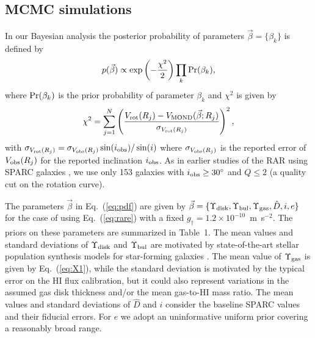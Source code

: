 \documentclass[twocolumn,tighten]{aastex63}
\begin{document}
\subsection{MCMC simulations}  \label{sec:mcmc}

In our Bayesian analysis the posterior probability of parameters $\vec{\beta}=\{\beta_k\}$ is defined by
   \begin{equation}
     p(\vec{\beta}) \propto \exp\left( -\frac{\chi^2}{2} \right) \prod_k {\rm Pr}(\beta_k),
     \label{eq:pdf}
   \end{equation}
where ${\rm Pr}(\beta_k)$ is the prior probability of parameter $\beta_k$ and $\chi^2$ is given by
   \begin{equation}
     \chi^2 = \sum_{j=1}^{N} \left( \frac{V_{\rm rot}(R_j) - V_{\rm MOND}(\vec{\beta};R_j)}{\sigma_{V_{\rm rot}(R_j)}} \right)^2,
     \label{eq:chi2}
   \end{equation}
with $\sigma_{V_{\rm rot}(R_j)}= \sigma_{V_{\rm obs}(R_j)} \sin(i_{\rm obs})/\sin(i)$ where $\sigma_{V_{\rm obs}(R_j)}$ is the reported error of $V_{\rm obs}(R_j)$ for the reported inclination $i_{\rm obs}$. As in earlier studies of the RAR using SPARC galaxies \citep{MLS, Lel17}, we use only 153 galaxies with $i_{\rm obs} \ge 30^\circ$ and $Q \le 2$ (a quality cut on the rotation curve).

The parameters $\vec{\beta}$ in Eq.~(\ref{eq:pdf}) are given by $\vec{\beta}=\{\Upsilon_{\rm disk}, \Upsilon_{\rm bul}, \Upsilon_{\rm gas}, \hat{D}, i, e\}$ for the case of using Eq.~(\ref{eq:rare}) with a fixed $g_\dagger=1.2\times 10^{-10}$~m~s$^{-2}$. The priors on these parameters are summarized in Table~1. The mean values and standard deviations of $\Upsilon_{\rm disk}$ and $\Upsilon_{\rm bul}$ are motivated by state-of-the-art stellar population synthesis models for star-forming galaxies \citep{Schom19}. The mean value of $\Upsilon_{\rm gas}$ is given by Eq.~(\ref{eq:X1}), while the standard deviation is motivated by the typical error on the HI flux calibration, but it could also represent variations in the assumed gas disk thickness and/or the mean gas-to-HI mass ratio. The mean values and standard deviations of $\hat{D}$ and $i$ consider the baseline SPARC values and their fiducial errors. For $e$ we adopt an uninformative uniform prior covering a reasonably broad range.
\end{document}
